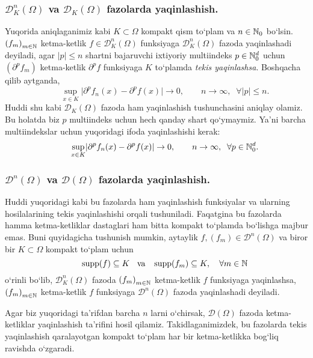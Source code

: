 \subsubsection{$\mathscr{D}^n_K(\Omega)$ va $\mathscr{D}_K(\Omega)$ fazolarda yaqinlashish.} Yuqorida aniqlaganimiz kabi $K\subset \Omega$ kompakt qism to`plam va $n\in\mathbb{N}_0$ bo`lsin. $\left(f_m\right)_{m\in \mathbb{N}}$ ketma-ketlik $f\in \mathscr{D}^n_K(\Omega)$ funksiyaga $\mathscr{D}^n_K(\Omega)$ fazoda yaqinlashadi deyiladi, agar $|p|\le n$ shartni bajaruvchi ixtiyoriy multiindeks $p\in \mathbb{N}_0^d$ uchun $\left(\partial^p f_m \right)$ ketma-ketlik $\partial^p f$ funksiyaga $K$ to`plamda \emph{tekis yaqinlashsa}. Boshqacha qilib aytganda, 
\begin{equation*}
    \qquad\sup\limits_{x\in K}\lvert \partial^p f_n(x)-\partial^p f(x)\rvert\to 0,\qquad n\to \infty, \;\; \forall \lvert p\rvert\le n.
\end{equation*}
Huddi shu kabi $\mathscr{D}_K(\Omega)$ fazoda ham yaqinlashish tushunchasini aniqlay olamiz. Bu holatda biz $p$ multiindeks uchun hech qanday shart qo`ymaymiz. Ya'ni barcha multiindekslar uchun yuqoridagi ifoda yaqinlashishi kerak:
\begin{equation*}
    \qquad\sup\limits_{x\in K}\lvert \partial^p f_n(x)-\partial^p f(x)\rvert\to 0,\qquad n\to \infty, \;\; \forall p\in \mathbb{N}_0^d.
\end{equation*}
\subsubsection{$\mathscr{D}^n(\Omega)$ va $\mathscr{D}(\Omega)$ fazolarda yaqinlashish.}
Huddi yuqoridagi kabi bu fazolarda ham yaqinlashish funksiyalar va ularning hosilalarining tekis yaqinlashishi orqali tushuniladi. Faqatgina bu fazolarda hamma ketma-ketliklar dastaglari ham bitta kompakt to`plamda bo`lishga majbur emas. Buni quyidagicha tushunish mumkin, aytaylik $f, \left(f_m\right)\in \mathscr{D}^n(\Omega)$ va biror bir $K\subset \Omega$ kompakt to`plam uchun 
\begin{equation*}
    \qquad\operatorname{supp}(f)\subseteq K \;\;\textnormal{ va }\;\; \operatorname{supp}(f_m)\subseteq K, \quad \forall m\in \mathbb{N}
\end{equation*}
o`rinli bo`lib, $\mathscr{D}_K^n(\Omega)$ fazoda  $\left(f_m\right)_{m\in \mathbb{N}}$ ketma-ketlik $f$ funksiyaga yaqinlashsa, $\left(f_m\right)_{m\in \mathbb{N}}$ ketma-ketlik $f$ funksiyaga $\mathscr{D}^n(\Omega)$ fazoda yaqinlashadi deyiladi. 

Agar biz yuqoridagi ta'rifdan barcha $n$ larni o`chirsak, $\mathscr{D}(\Omega)$ fazoda ketma-ketliklar yaqinlashish ta'rifini hosil qilamiz. Takidlaganimizdek, bu fazolarda tekis yaqinlashish qaralayotgan kompakt to`plam har bir ketma-ketlikka bog`liq ravishda o`zgaradi.

